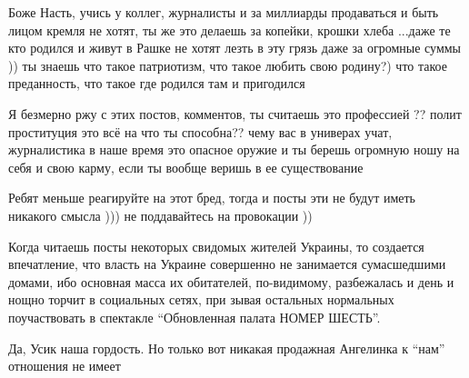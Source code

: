 \begin{itemize}
Боже Насть, учись у коллег, журналисты и за миллиарды продаваться и быть лицом
кремля не хотят, ты же это делаешь за копейки, крошки хлеба ...даже те кто
родился и живут в Рашке не хотят лезть в эту грязь даже за огромные суммы )) ты
знаешь что такое патриотизм, что такое любить свою родину?) что такое
преданность, что такое где родился там и пригодился



Я безмерно ржу с этих постов, комментов, ты считаешь это профессией ?? полит
проституция это всё на что ты способна?? чему вас в универах учат, журналистика
в наше время это опасное оружие и ты берешь огромную ношу на себя и свою карму,
если ты вообще веришь в ее существование


Ребят меньше реагируйте на этот бред, тогда и посты эти не будут иметь никакого
смысла ))) не поддавайтесь на провокации ))


Когда читаешь посты некоторых свидомых жителей Украины, то создается
впечатление, что власть на Украине совершенно не занимается сумасшедшими
домами, ибо основная масса их обитателей, по-видимому, разбежалась и день и нощно
торчит в социальных сетях, при зывая остальных нормальных поучаствовать в
спектакле \enquote{Обновленная палата НОМЕР ШЕСТЬ}.

Да, Усик наша гордость. Но только вот никакая продажная Ангелинка к \enquote{нам} отношения не имеет

\end{itemize} %
